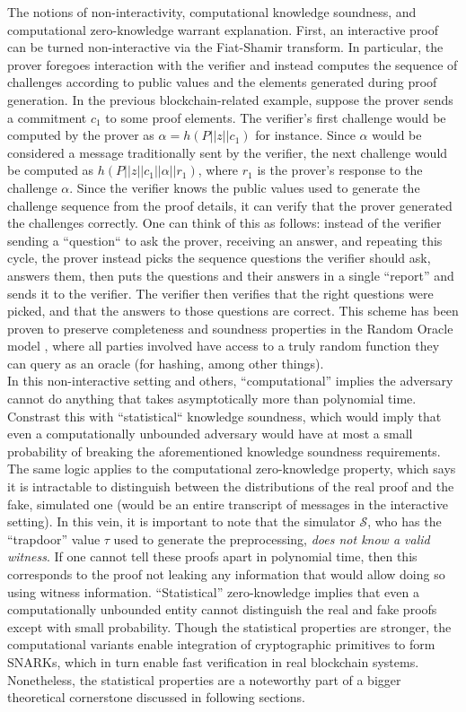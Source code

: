 \noindent The notions of non-interactivity, computational knowledge soundness, and computational zero-knowledge warrant explanation. First, an interactive proof can be turned non-interactive via the Fiat-Shamir transform. In particular, the prover foregoes interaction with the verifier and instead computes the sequence of challenges according to public values and the elements generated during proof generation. In the previous blockchain-related example, suppose the prover sends a commitment $c_1$ to some proof elements. The verifier's first challenge would be computed by the prover as $\alpha = h(P || z || c_1)$ for instance. Since $\alpha$ would be considered a message traditionally sent by the verifier, the next challenge would be computed as $h(P || z || c_1 || \alpha || r_1)$, where $r_1$ is the prover's response to the challenge $\alpha$. Since the verifier knows the public values used to generate the challenge sequence from the proof details, it can verify that the prover generated the challenges correctly. One can think of this as follows: instead of the verifier sending a ``question`` to ask the prover, receiving an answer, and repeating this cycle, the prover instead picks the sequence questions the verifier should ask, answers them, then puts the questions and their answers in a single ``report'' and sends it to the verifier. The verifier then verifies that the right questions were picked, and that the answers to those questions are correct. This scheme has been proven to preserve completeness and soundness properties in the Random Oracle model \cite{rom}, where all parties involved have access to a truly random function they can query as an oracle (for hashing, among other things).\\

\noindent In this non-interactive setting and others, ``computational'' implies the adversary cannot do anything that takes asymptotically more than polynomial time. Constrast this with ``statistical`` knowledge soundness, which would imply that even a computationally unbounded adversary would have at most a small probability of breaking the aforementioned knowledge soundness requirements. The same logic applies to the computational zero-knowledge property, which says it is intractable to distinguish between the distributions of the real proof and the fake, simulated one (would be an entire transcript of messages in the interactive setting). In this vein, it is important to note that the simulator $\mathcal{S}$, who has the ``trapdoor'' value $\tau$ used to generate the preprocessing, \textit{does not know a valid witness}. If one cannot tell these proofs apart in polynomial time, then this corresponds to the proof not leaking any information that would allow doing so using witness information. ``Statistical'' zero-knowledge implies that even a computationally unbounded entity cannot distinguish the real and fake proofs except with small probability. Though the statistical properties are stronger, the computational variants enable integration of cryptographic primitives to form SNARKs, which in turn enable fast verification in real blockchain systems. Nonetheless, the statistical properties are a noteworthy part of a bigger theoretical cornerstone discussed in following sections.

